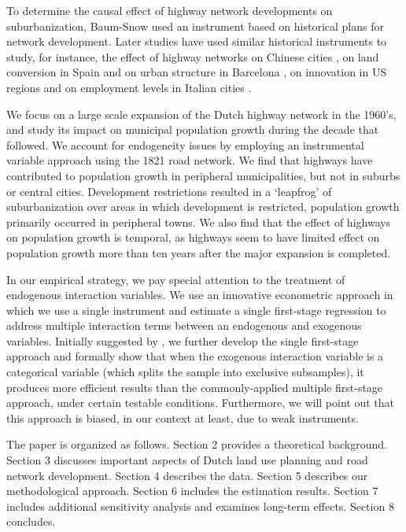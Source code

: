 \documentclass[a4paper,authoryear,review]{elsarticle}  	%
\begin{document}
	To determine the causal effect of highway network developments on suburbanization, Baum-Snow used an instrument based on historical plans for network development. Later studies have used similar historical instruments to study, for instance, the effect of highway networks on Chinese cities \citep{Baum-Snow2012}, on land conversion in Spain and on urban structure in Barcelona \citep{Garcia-Lopez2014,Garcia-Lopez2015}, on innovation in US regions \citep{Agrawal2016} and on employment levels in Italian cities \citep{Percoco2016}. %
	
	We focus on a large scale expansion of the Dutch highway network in the 1960’s, and study its impact on municipal population growth during the decade that followed. We account for endogeneity issues by employing an instrumental variable approach using the 1821 road network. 	
	We find that highways have contributed to population growth in peripheral municipalities, but not in suburbs or central cities. Development restrictions resulted in a ‘leapfrog’ of suburbanization over areas in which development is restricted, population growth primarily occurred in peripheral towns. We also find that the effect of highways on population growth is temporal, as highways seem to have limited effect on population growth more than ten years after the major expansion is completed.
	
	In our empirical strategy, we pay special attention to the treatment of endogenous interaction variables. We use an innovative econometric approach in which we use a single instrument and estimate a single first-stage regression to address multiple interaction terms between an endogenous and exogenous variables. Initially suggested by \citet{Balli2013}, we further develop the single first-stage approach and formally show that when the exogenous interaction variable is a categorical variable (which splits the sample into exclusive subsamples), it produces more efficient results than the commonly-applied multiple first-stage approach, under certain testable conditions.	
	Furthermore, we will point out that this approach is biased, in our context at least, due to weak instruments. 
	
	The paper is organized as follows. Section 2 provides a theoretical background. Section 3 discusses important aspects of Dutch land use planning and road network development. Section 4 describes the data. Section 5 describes our methodological approach. Section 6 includes the estimation results. Section 7 includes additional sensitivity analysis and examines long-term effects. Section 8 concludes.
	
\end{document}
